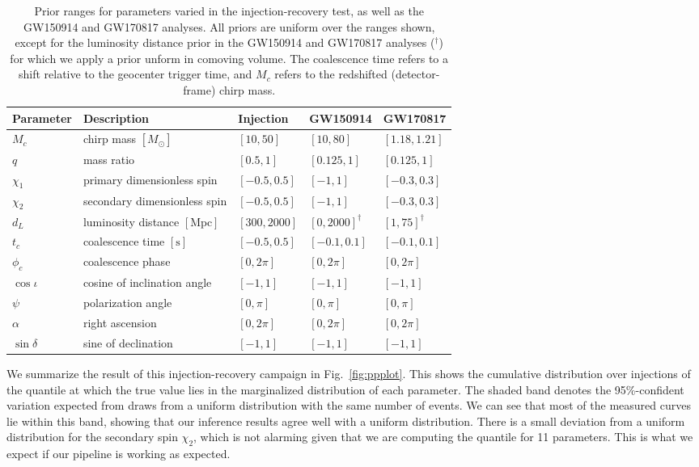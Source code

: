 \documentclass[twocolumn]{aastex631}
\begin{document}
\begin{table*}[hbt!]
    \begin{center}
    \begin{tabular}{ l l l l l }
    \hline
    \hline
    Parameter &  Description & Injection & GW150914 & GW170817\\
    \hline

    $M_c$ & chirp mass $[M_\odot]$& $[10, 50]$ & $[10,80]$ & $[1.18,1.21]$ \\
    $q$ & mass ratio & $[0.5, 1]$ & $[0.125,1]$ & $[0.125,1]$ \\
    $\chi_1$ & primary dimensionless spin& $[-0.5, 0.5]$ & $[-1,1]$ & $[-0.3,0.3]$ \\
    $\chi_2$ & secondary dimensionless spin & $[-0.5, 0.5]$ & $[-1,1]$ & $[-0.3,0.3]$ \\
    $d_L$ & luminosity distance $[\textrm{Mpc}]$ & $[300, 2000]$ & $[0, 2000]^\dag$ & $[1, 75]^\dag$ \\
    $t_c$ & coalescence time $[\textrm{s}]$& $[-0.5, 0.5]$ & $[-0.1, 0.1]$ & $[-0.1, 0.1]$ \\
    $\phi_c$ & coalescence phase & $[0, 2\pi]$ & $[0, 2\pi]$ & $[0, 2\pi]$ \\
    $\cos{\iota}$ & cosine of inclination angle & $[-1, 1]$ & $[-1, 1]$ & $[-1, 1]$ \\
    $\psi$ & polarization angle & $[0, \pi]$ & $[0, \pi]$ & $[0, \pi]$ \\
    $\alpha$ & right ascension & $[0, 2\pi]$ & $[0, 2\pi]$ & $[0, 2\pi]$ \\
    $\sin{\delta}$ & sine of declination & $[-1, 1]$ & $[-1, 1]$ & $[-1, 1]$ \\

    \hline
    \hline
    \end{tabular}
    \caption{Prior ranges for parameters varied in the injection-recovery test,
    as well as the GW150914 and GW170817 analyses. All priors are uniform over
    the ranges shown, except for the luminosity distance prior in the GW150914
    and GW170817 analyses ($^\dag$) for which we apply a prior unform in
    comoving volume. The coalescence time refers to a shift relative to the
    geocenter trigger time, and $M_c$ refers to the redshifted (detector-frame)
    chirp mass.}
    \label{tab:parameters}
    \end{center}
\end{table*}

We summarize the result of this injection-recovery campaign in
Fig.~\ref{fig:ppplot}. This shows the cumulative distribution over injections
of the quantile at which the true value lies in the marginalized distribution
of each parameter. The shaded band denotes the 95\%-confident variation
expected from draws from a uniform distribution with the same number of events.
We can see that most of the measured curves lie within this band, showing that
our inference results agree well with a uniform distribution. There is a small
deviation from a uniform distribution for the secondary spin $\chi_2$, which is
not alarming given that we are computing the quantile for 11 parameters.  This
is what we expect if our pipeline is working as expected.
\end{document}
